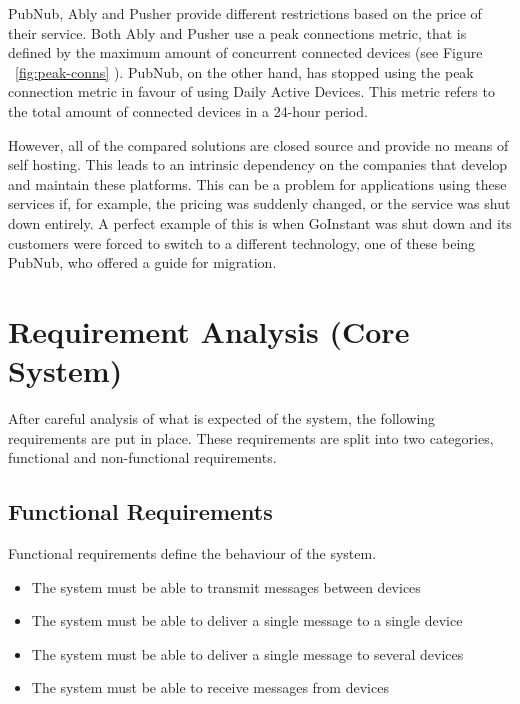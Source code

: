 PubNub, Ably and Pusher provide different restrictions based on the price of their service. Both Ably and Pusher use a peak connections metric, that is defined by the maximum amount of concurrent connected devices (see Figure ~\ref{fig:peak-conns} ). PubNub, on the other hand, has stopped using the peak connection metric\cite{pubnub-peak} in favour of using Daily Active Devices. This metric refers to the total amount of connected devices in a 24-hour period.

However, all of the compared solutions are closed source and provide no means of self hosting. This leads to an intrinsic dependency on the companies that develop and maintain these platforms. This can be a problem for applications using these services if, for example, the pricing was suddenly changed, or the service was shut down entirely. A perfect example of this is when GoInstant was shut down and its customers were forced to switch to a different technology, one of these being PubNub, who offered a guide for migration\cite{pubnub-goinstant}.

\section{Requirement Analysis (Core System)}

After careful analysis of what is expected of the system, the following requirements are put in place. These requirements are split into two categories, functional and non-functional requirements.

\subsection{Functional Requirements}
Functional requirements define the behaviour of the system.
\begin{itemize}
\item The system must be able to transmit messages between devices
\item The system must be able to deliver a single message to a single device
\item The system must be able to deliver a single message to several devices
\item The system must be able to receive messages from devices
\end{itemize}


